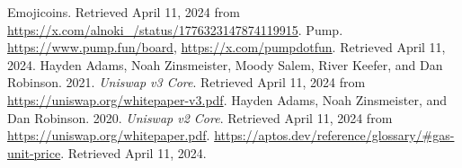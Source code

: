 \documentclass[table, twocolumn]{article}
\begin{document}
\begin{thebibliography}{2}
   Emojicoins. Retrieved April 11, 2024 from
  \url{https://x.com/alnoki_/status/1776323147874119915}.
   Pump. \url{https://www.pump.fun/board}, \url{https://x.com/pumpdotfun}.
  Retrieved April 11, 2024.
   Hayden Adams, Noah Zinsmeister, Moody Salem, River Keefer, and Dan
  Robinson. 2021. \emph{Uniswap v3 Core}. Retrieved April 11, 2024 from
  \url{https://uniswap.org/whitepaper-v3.pdf}.
   Hayden Adams, Noah Zinsmeister, and Dan Robinson. 2020. \emph{Uniswap
    v2 Core}. Retrieved April 11, 2024 from \url{https://uniswap.org/whitepaper.pdf}.
   \url{https://aptos.dev/reference/glossary/#gas-unit-price}. Retrieved
  April 11, 2024.
\end{thebibliography}
\end{document}
